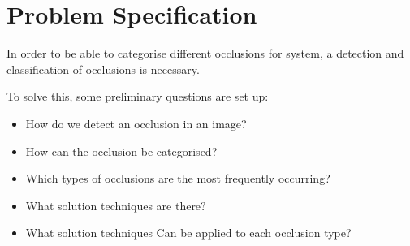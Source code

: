 \section{Problem Specification}
In order to be able to categorise different occlusions for system, a detection and classification of occlusions is necessary.

To solve this, some preliminary questions are set up:
\begin{itemize}
	\item How do we detect an occlusion in an image?
	\item How can the occlusion be categorised?
	\item Which types of occlusions are the most frequently occurring?
	\item What solution techniques are there? 
	\item What solution techniques Can be applied to each occlusion type?
\end{itemize}